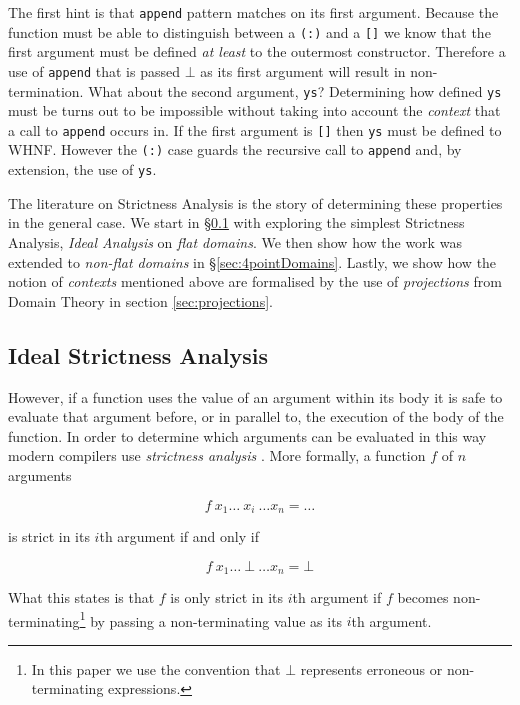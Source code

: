 The first hint is that \verb|append| pattern matches on its first argument.
Because the function must be able to distinguish between a \verb|(:)| and a
\verb|[]| we know that the first argument must be defined \emph{at least} to
the outermost constructor. Therefore a use of \verb|append| that is passed
$\bot$ as its first argument will result in non-termination. What about the
second argument, \verb|ys|? Determining how defined \verb|ys| must be turns
out to be impossible without taking into account the \emph{context} that
a call to \verb|append| occurs in. If the first argument is \verb|[]|
then \verb|ys| must be defined to WHNF. However the \verb|(:)| case
guards the recursive call to \verb|append| and, by extension, the use
of \verb|ys|.

The literature on Strictness Analysis is the story of determining these
properties in the general case. We start in \S \ref{sec:idealAnalysis} with
exploring the simplest Strictness Analysis, \emph{Ideal Analysis} on \emph{flat
domains}. We then show how the work was extended to \emph{non-flat domains} in
\S \ref{sec:4pointDomains}. Lastly, we show how the notion of \emph{contexts}
mentioned above are formalised by the use of \emph{projections} from Domain
Theory in section \ref{sec:projections}.


\subsection{Ideal Strictness Analysis}
\label{sec:idealAnalysis}

However, if a function uses the value of an argument within its body it is safe
to evaluate that argument before, or in parallel to, the execution of the body
of the function. In order to determine which arguments can be evaluated in this
way modern compilers use \emph{strictness analysis} \citep{mycroft1980theory}.
More formally, a function $f$ of $n$ arguments

$$
    f\ x_{1} \dots \ x_{i} \ \dots x_{n} = \dots
$$

\noindent is strict in its $i$th argument if and only if

$$
    f\ x_{1} \dots \ \bot \ \dots x_{n} = \bot
$$

What this states is that $f$ is only strict in its $i$th argument if $f$
becomes non-terminating\footnote{In this paper we use the convention that
$\bot$ represents erroneous or non-terminating expressions.} by passing a
non-terminating value as its $i$th argument.

